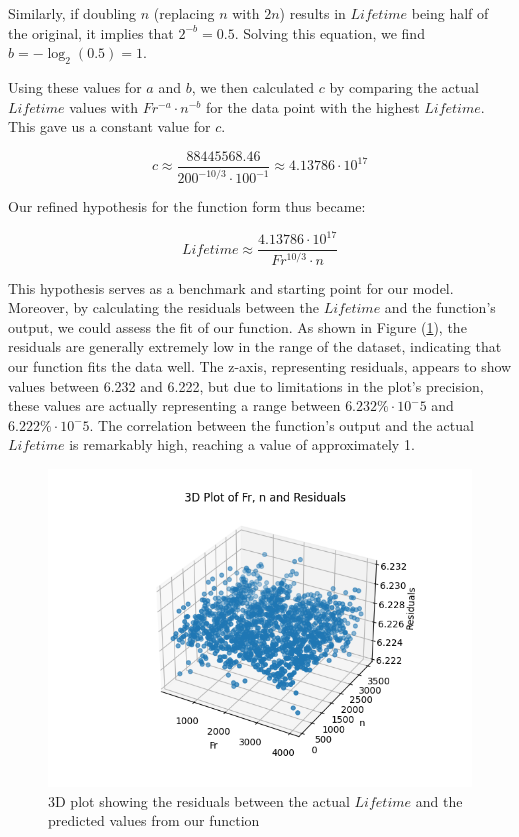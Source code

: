 Similarly, if doubling $n$ (replacing $n$ with $2n$) results in $Lifetime$ being half of the original, it implies that $2^{-b} = 0.5$. Solving this equation, we find $b = -\log_2(0.5) = 1$.

Using these values for $a$ and $b$, we then calculated $c$ by comparing the actual $Lifetime$ values with $Fr^{-a} \cdot n^{-b}$ for the data point with the highest $Lifetime$. This gave us a constant value for $c$.

\begin{equation}
\label{eq:constant_c}
c \approx \frac{88445568.46}{200^{-10/3} \cdot 100^{-1}} \approx 4.13786 \cdot 10^{17}
\end{equation}

Our refined hypothesis for the function form thus became:

\begin{equation}
\label{eq:refined_hypothesis}
{Lifetime} \approx \frac{4.13786 \cdot 10^{17}}{Fr^{10/3} \cdot n}
\end{equation}

This hypothesis serves as a benchmark and starting point for our model. Moreover, by calculating the residuals between the $Lifetime$ and the function's output, we could assess the fit of our function. As shown in Figure (\ref{fig:bearings-residuals}), the residuals are generally extremely low in the range of the dataset, indicating that our function fits the data well. The z-axis, representing residuals, appears to show values between 6.232 and 6.222, but due to limitations in the plot's precision, these values are actually representing a range between $6.232\% \cdot 10^-5$ and $6.222\% \cdot 10^-5$. The correlation between the function's output and the actual $Lifetime$ is remarkably high, reaching a value of approximately 1.

\begin{figure}[ht]
    \centering
    \includegraphics[width=\textwidth]{assets/bearings-eda/3dplot-residuals.png}
    \caption{3D plot showing the residuals between the actual $Lifetime$ and the predicted values from our function}
    \label{fig:bearings-residuals}
\end{figure}

